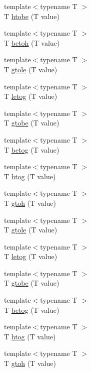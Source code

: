 \begin{DoxyCompactItemize}
\item 
{\footnotesize template$<$typename T $>$ }\\T \hyperlink{byteswap_8hh_a0ec9bd801b3cff46ad2537234f1f1a67}{htobe} (T value)
\item 
{\footnotesize template$<$typename T $>$ }\\T \hyperlink{byteswap_8hh_a2af77d34ef12718184be94c5b14a27ce}{betoh} (T value)
\item 
{\footnotesize template$<$typename T $>$ }\\T \hyperlink{namespaceBigEndianGuest_aeab167e8a814d73ceb79ff46de96ba0d}{gtole} (T value)
\item 
{\footnotesize template$<$typename T $>$ }\\T \hyperlink{namespaceBigEndianGuest_a245baef980523bf81f2285b1fa3e74b8}{letog} (T value)
\item 
{\footnotesize template$<$typename T $>$ }\\T \hyperlink{namespaceBigEndianGuest_ad77d11499d6bfb2b207b17cb7319f5ec}{gtobe} (T value)
\item 
{\footnotesize template$<$typename T $>$ }\\T \hyperlink{namespaceBigEndianGuest_a50d31a883b3eda39db344a37f8381fe6}{betog} (T value)
\item 
{\footnotesize template$<$typename T $>$ }\\T \hyperlink{namespaceBigEndianGuest_a10c3370b6af5a1216a2a64c0d379f788}{htog} (T value)
\item 
{\footnotesize template$<$typename T $>$ }\\T \hyperlink{namespaceBigEndianGuest_adb51b41dd17278558edf419359f52de6}{gtoh} (T value)
\item 
{\footnotesize template$<$typename T $>$ }\\T \hyperlink{namespaceLittleEndianGuest_aa763802ce48ab3ae2d2f00f36dee207c}{gtole} (T value)
\item 
{\footnotesize template$<$typename T $>$ }\\T \hyperlink{namespaceLittleEndianGuest_a2afbf7328c847d732303dc44c67c425d}{letog} (T value)
\item 
{\footnotesize template$<$typename T $>$ }\\T \hyperlink{namespaceLittleEndianGuest_aea54106b2611ff7926651b34e2b48e50}{gtobe} (T value)
\item 
{\footnotesize template$<$typename T $>$ }\\T \hyperlink{namespaceLittleEndianGuest_ad2b70ae43b0a5f3901a36c4063afb95b}{betog} (T value)
\item 
{\footnotesize template$<$typename T $>$ }\\T \hyperlink{namespaceLittleEndianGuest_a78d5c03420b8ee62e625df90ca9fa66d}{htog} (T value)
\item 
{\footnotesize template$<$typename T $>$ }\\T \hyperlink{namespaceLittleEndianGuest_aa69faf82e7abf95025efbebedcbae1b2}{gtoh} (T value)
\end{DoxyCompactItemize}
